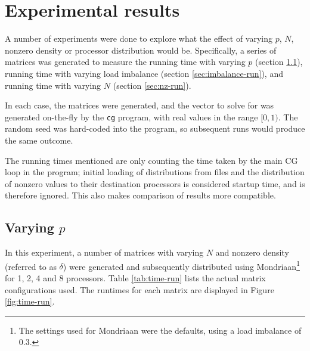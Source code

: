 \documentclass[a4paper]{article}
\begin{document}
\section{Experimental results}

A number of experiments were done to explore what the effect of varying $p$,
$N$, nonzero density or processor distribution would be. Specifically, a series
of matrices was generated to measure the running time with varying $p$ (section
\ref{sec:time-run}), running time with varying load imbalance (section
\ref{sec:imbalance-run}), and running time with varying $N$ (section
\ref{sec:nz-run}).

In each case, the matrices were generated, and the vector to solve for
was generated on-the-fly by the \texttt{cg} program, with real values
in the range $[0,1)$. The random seed was hard-coded into the program,
    so subsequent runs would produce the same outcome.

The running times mentioned are only counting the time taken by the main CG loop
in the program; initial loading of distributions from files and the distribution of
nonzero values to their destination processors is considered startup time, and is therefore
ignored. This also makes comparison of results more compatible.

\subsection{Varying $p$}\label{sec:time-run}

In this experiment, a number of matrices with varying $N$ and nonzero density (referred to as $\delta$) were generated and
subsequently distributed using Mondriaan\footnote{The settings used for Mondriaan
were the defaults, using a load imbalance of 0.3.} for 1, 2, 4 and 8 processors. Table \ref{tab:time-run} lists the actual matrix configurations used. The runtimes for each matrix are displayed in Figure \ref{fig:time-run}.
\end{document}
